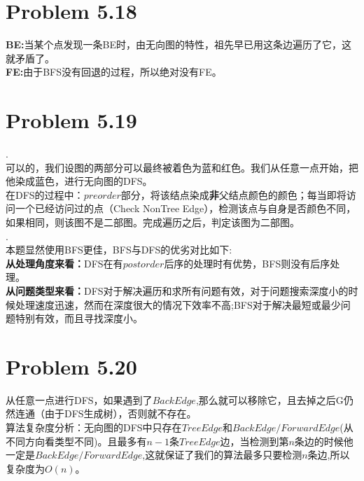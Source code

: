 \documentclass[twocolumn]{ctexart}
\begin{document}
\section*{Problem 5.18}
\indent \textbf{BE:}当某个点发现一条BE时，由无向图的特性，祖先早已用这条边遍历了它，这就矛盾了。\\
\indent \textbf{FE:}由于BFS没有回退的过程，所以绝对没有FE。




\section*{Problem 5.19}
.\\
\indent 可以的，我们设图的两部分可以最终被着色为蓝和红色。我们从任意一点开始，把他染成蓝色，进行无向图的DFS。\\
\indent 在DFS的过程中：$preorder$部分，将该结点染成\textbf{非}父结点颜色的颜色；每当即将访问一个已经访问过的点（Check NonTree Edge），检测该点与自身是否颜色不同，如果相同，则该图不是二部图。完成遍历之后，判定该图为二部图。\\
.\\
\indent 本题显然使用BFS更佳，BFS与DFS的优劣对比如下:\\
\indent \textbf{从处理角度来看：}DFS在有$post order$后序的处理时有优势，BFS则没有后序处理。\\
\indent \textbf{从问题类型来看：}DFS对于解决遍历和求所有问题有效，对于问题搜索深度小的时候处理速度迅速，然而在深度很大的情况下效率不高;BFS对于解决最短或最少问题特别有效，而且寻找深度小。\\


\section*{Problem 5.20}
\indent 从任意一点进行DFS，如果遇到了$BackEdge$,那么就可以移除它，且去掉之后G仍然连通（由于DFS生成树），否则就不存在。\\
\indent 算法复杂度分析：无向图的DFS中只存在$TreeEdge$和$BackEdge/ForwardEdge$(从不同方向看类型不同)。且最多有$n-1$条$TreeEdge$边，当检测到第$n$条边的时候他一定是$BackEdge/ForwardEdge$,这就保证了我们的算法最多只要检测$n$条边,所以复杂度为$O(n)$。\\
\end{document}
